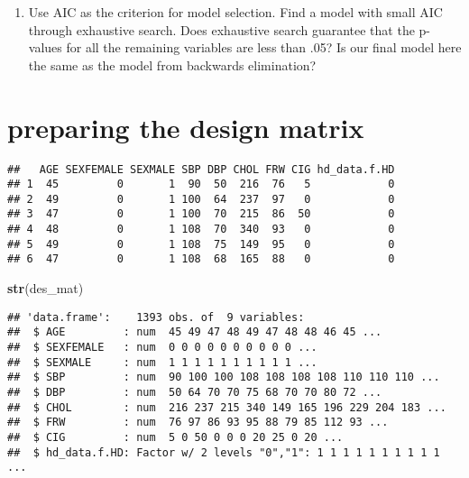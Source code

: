 \documentclass[]{article}
\newenvironment{Shaded}{\begin{snugshade}}{\end{snugshade}}
\newcommand{\KeywordTok}[1]{\textcolor[rgb]{0.13,0.29,0.53}{\textbf{#1}}}
\newcommand{\DecValTok}[1]{\textcolor[rgb]{0.00,0.00,0.81}{#1}}
\newcommand{\StringTok}[1]{\textcolor[rgb]{0.31,0.60,0.02}{#1}}
\newcommand{\OperatorTok}[1]{\textcolor[rgb]{0.81,0.36,0.00}{\textbf{#1}}}
\newcommand{\NormalTok}[1]{#1}
\providecommand{\tightlist}{%
  \setlength{\itemsep}{0pt}\setlength{\parskip}{0pt}}
\begin{document}
\begin{enumerate}
\def\labelenumi{\roman{enumi}.}
\setcounter{enumi}{1}
\tightlist
\item
  Use AIC as the criterion for model selection. Find a model with small
  AIC through exhaustive search. Does exhaustive search guarantee that
  the p-values for all the remaining variables are less than .05? Is our
  final model here the same as the model from backwards elimination?
\end{enumerate}

\section{preparing the design matrix}\label{preparing-the-design-matrix}

\begin{Shaded}
\end{Shaded}

\begin{verbatim}
##   AGE SEXFEMALE SEXMALE SBP DBP CHOL FRW CIG hd_data.f.HD
## 1  45         0       1  90  50  216  76   5            0
## 2  49         0       1 100  64  237  97   0            0
## 3  47         0       1 100  70  215  86  50            0
## 4  48         0       1 108  70  340  93   0            0
## 5  49         0       1 108  75  149  95   0            0
## 6  47         0       1 108  68  165  88   0            0
\end{verbatim}

\begin{Shaded}
\begin{Highlighting}[]
\KeywordTok{str}\NormalTok{(des_mat)}
\end{Highlighting}
\end{Shaded}

\begin{verbatim}
## 'data.frame':    1393 obs. of  9 variables:
##  $ AGE         : num  45 49 47 48 49 47 48 48 46 45 ...
##  $ SEXFEMALE   : num  0 0 0 0 0 0 0 0 0 0 ...
##  $ SEXMALE     : num  1 1 1 1 1 1 1 1 1 1 ...
##  $ SBP         : num  90 100 100 108 108 108 108 110 110 110 ...
##  $ DBP         : num  50 64 70 70 75 68 70 70 80 72 ...
##  $ CHOL        : num  216 237 215 340 149 165 196 229 204 183 ...
##  $ FRW         : num  76 97 86 93 95 88 79 85 112 93 ...
##  $ CIG         : num  5 0 50 0 0 0 20 25 0 20 ...
##  $ hd_data.f.HD: Factor w/ 2 levels "0","1": 1 1 1 1 1 1 1 1 1 1 ...
\end{verbatim}
\end{document}
